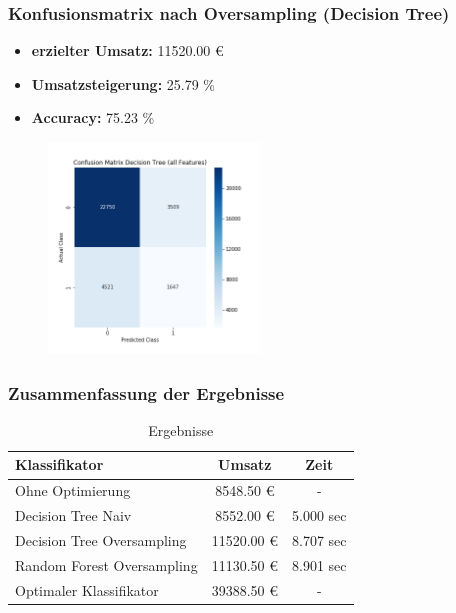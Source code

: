 \documentclass{beamer}
\begin{document}
\begin{frame}
\frametitle{Konfusionsmatrix nach Oversampling (Decision Tree)}
\begin{footnotesize}
\begin{itemize}
\item  \textbf{erzielter Umsatz:} 11520.00 \euro{}
\item \textbf{Umsatzsteigerung:}	25.79 \% 
\item \textbf{Accuracy:} 75.23 \%
\end{itemize}
\end{footnotesize}

\begin{figure}[ht]
	\centering
  \includegraphics[width=0.5\textwidth]{img/finalDecision.png} 	
	\label{fig1}
\end{figure}
\end{frame}

\begin{frame}
\frametitle{Zusammenfassung der Ergebnisse}
\begin{table}
\begin{tabular}{l c c}
\toprule
\textbf{Klassifikator} & \textbf{Umsatz} & \textbf{Zeit}\\
\midrule
Ohne Optimierung & 8548.50 \euro{} & - \\
Decision Tree Naiv & 8552.00 \euro{} & 5.000 sec\\
Decision Tree Oversampling  & 11520.00 \euro{} & 8.707 sec \\
Random Forest Oversampling  & 11130.50 \euro{} &  8.901 sec\\
Optimaler Klassifikator  & 39388.50 \euro{} &  -\\
\bottomrule
\end{tabular}
\caption{Ergebnisse}
\end{table}
\end{frame}
\end{document}
